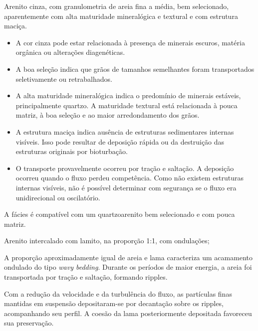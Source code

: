 \begin{description}[style=nextline,leftmargin=1.5cm,labelsep=0.5em]
\item[\textbf{Fácies A}] Arenito cinza, com granulometria de areia fina a
média, bem selecionado, aparentemente com alta maturidade mineralógica e
textural e com estrutura maciça.

\begin{itemize}
    \item A cor cinza pode estar relacionada à presença de minerais escuros,
    matéria orgânica ou alterações diagenéticas.

    \item A boa seleção indica que grãos de tamanhos semelhantes foram
    transportados seletivamente ou retrabalhados.

    \item A alta maturidade mineralógica indica o predomínio de minerais
    estáveis, principalmente quartzo. A maturidade textural está relacionada
    à pouca matriz, à boa seleção e ao maior arredondamento dos grãos.

    \item A estrutura maciça indica ausência de estruturas sedimentares
    internas visíveis. Isso pode resultar de deposição rápida ou da
    destruição das estruturas originais por bioturbação.

    \item O transporte provavelmente ocorreu por tração e saltação. A
    deposição ocorreu quando o fluxo perdeu competência. Como não existem
    estruturas internas visíveis, não é possível determinar com segurança
    se o fluxo era unidirecional ou oscilatório.
\end{itemize}

A fácies é compatível com um quartzoarenito bem selecionado e com pouca matriz.

  \item[\textbf{Fácies B}] Arenito intercalado com lamito, na proporção 1:1,
  com ondulações;

A proporção aproximadamente igual de areia e lama caracteriza um acamamento
ondulado do tipo \textit{wavy bedding}. Durante os períodos de maior energia,
a areia foi transportada por tração e saltação, formando ripples.

Com a redução da velocidade e da turbulência do fluxo, as partículas finas
mantidas em suspensão depositaram-se por decantação sobre os ripples,
acompanhando seu perfil. A coesão da lama posteriormente depositada favoreceu
sua preservação.


\end{description}
